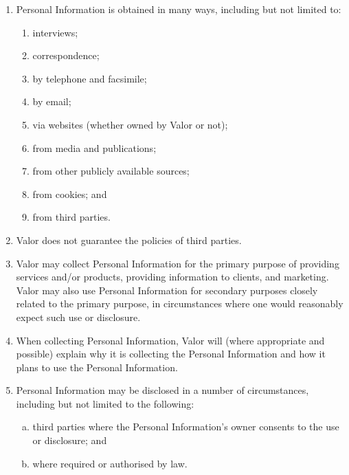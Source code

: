 \documentclass[10pt]{article}
\begin{document}
\begin{enumerate}[(1)]
\item
Personal Information is obtained in many ways, including but not limited to:
	\begin{enumerate}
	\item
	interviews;

	\item
	correspondence;

	\item
	by telephone and facsimile;
	
	\item
	by email;
	
	\item
	via websites (whether owned by Valor or not);
	
	\item
	from media and publications;
	
	\item
	from other publicly available sources;
	
	\item
	from cookies; and
	
	\item
	from third parties.
	\end{enumerate}

\item
Valor does not guarantee the policies of third parties.

\item
Valor may collect Personal Information for the primary purpose of providing services and/or products, providing information to clients, and marketing. Valor may also use Personal Information for secondary purposes closely related to the primary purpose, in circumstances where one would reasonably expect such use or disclosure.

\item
When collecting Personal Information, Valor will (where appropriate and possible) explain why it is collecting the Personal Information and how it plans to use the Personal Information.

\item
Personal Information may be disclosed in a number of circumstances, including but not limited to the following:
	\begin{enumerate}[(a)]
	\item
	third parties where the Personal Information's owner consents to the use or disclosure; and
	
	\item
	where required or authorised by law.
	\end{enumerate}


\end{enumerate}
\end{document}
